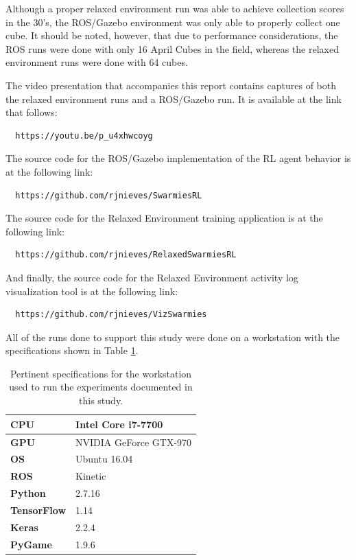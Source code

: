 \documentclass[sigconf,authordraft]{acmart}
\begin{document}
Although a proper relaxed environment run was able to achieve collection scores in the 30's, the ROS/Gazebo environment was only able to properly collect one cube. It should be noted, however, that due to performance considerations, the ROS runs were done with only 16 April Cubes in the field, whereas the relaxed environment runs were done with 64 cubes.

The video presentation that accompanies this report contains captures of both the relaxed environment runs and a ROS/Gazebo run. It is available at the link that follows:

\begin{verbatim}
  https://youtu.be/p_u4xhwcoyg
\end{verbatim}

The source code for the ROS/Gazebo implementation of the RL agent behavior is at the following link:

\begin{verbatim}
  https://github.com/rjnieves/SwarmiesRL
\end{verbatim}

The source code for the Relaxed Environment training application is at the following link:

\begin{verbatim}
  https://github.com/rjnieves/RelaxedSwarmiesRL
\end{verbatim}

And finally, the source code for the Relaxed Environment activity log visualization tool is at the following link:

\begin{verbatim}
  https://github.com/rjnieves/VizSwarmies
\end{verbatim}

All of the runs done to support this study were done on a workstation with the specifications shown in Table \ref{tab:workstation_specs}.

\begin{table}
  \centering
  \caption{Pertinent specifications for the workstation used to run the experiments documented in this study.}
  \label{tab:workstation_specs}
  \begin{tabular}{|l|l|}
    \hline\hline
    \textbf{CPU} & Intel Core i7-7700 \\
    \hline
    \textbf{GPU} & NVIDIA GeForce GTX-970 \\
    \hline
    \textbf{OS} & Ubuntu 16.04 \\
    \hline
    \textbf{ROS} & Kinetic \\
    \hline
    \textbf{Python} & 2.7.16 \\
    \hline
    \textbf{TensorFlow} & 1.14 \\
    \hline
    \textbf{Keras} & 2.2.4 \\
    \hline
    \textbf{PyGame} & 1.9.6 \\
    \hline\hline
  \end{tabular}
\end{table}
\end{document}
